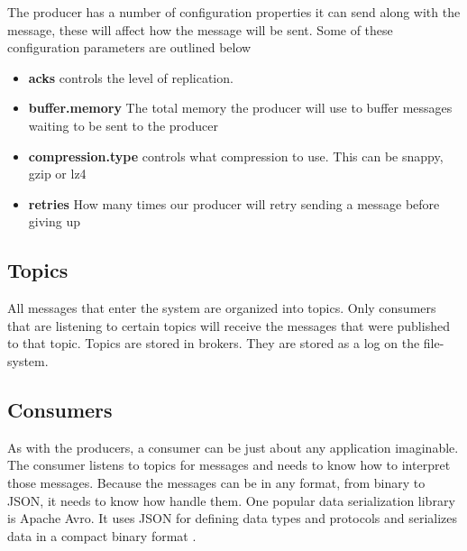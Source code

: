 The producer has a number of configuration properties it can send along with the message, these will affect how the message will be sent. Some of these configuration parameters are outlined below

\begin{itemize}
  \item \textbf{acks} controls the level of replication.
  \item \textbf{buffer.memory} The total memory the producer will use to buffer messages waiting to be sent to the producer
  \item \textbf{compression.type} controls what compression to use. This can be snappy, gzip or lz4
  \item \textbf{retries} How many times our producer will retry sending a message before giving up
\end{itemize}

\subsection{Topics}

All messages that enter the system are organized into topics. Only consumers that are listening to certain topics will receive the messages that were published to that topic. Topics are stored in brokers. They are stored as a log on the file-system.

\subsection{Consumers}

As with the producers, a consumer can be just about any application imaginable. The consumer listens to topics for messages and needs to know how to interpret those messages. Because the messages can be in any format, from binary to JSON, it needs to know how handle them. One popular data serialization library is Apache Avro. It uses JSON for defining data types and protocols and serializes data in a compact binary format \cite{wiki:avro}.